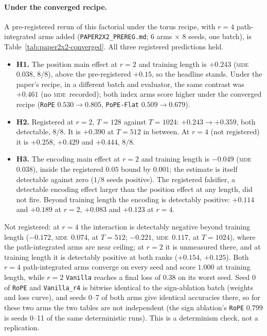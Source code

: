 \documentclass[10pt]{article}
\newcommand{\mde}{\textsc{mde}}
\newcommand{\arm}[1]{\texttt{#1}}
\begin{document}
\PaperTwoByTwoTable

\paragraph{Under the converged recipe.} A pre-registered rerun of this factorial under the torus
recipe, with $r=4$ path-integrated arms added (\texttt{PAPER2X2\_PREREG.md}; 6 arms $\times$ 8 seeds,
one batch), is Table~\ref{tab:paper2x2-converged}. All three registered predictions held.
\begin{itemize}
\item \textbf{H1.} The position main effect at $r=2$ and training length is $+0.243$ (\mde\ $0.038$,
$8/8$), above the pre-registered $+0.15$, so the headline stands. Under the paper's recipe, in a different
batch and evaluator, the same contrast was $+0.461$ (no \mde\ recorded); both index arms score higher under
the converged recipe (\arm{RoPE} $0.530\to0.805$, \arm{PoPE-Flat} $0.509\to0.679$).
\item \textbf{H2.} Registered at $r=2$, $T=128$ against $T=1024$: $+0.243\to+0.359$, both detectable, $8/8$.
It is $+0.390$ at $T=512$ in between. At $r=4$ (not registered) it is $+0.258$, $+0.429$ and $+0.444$, $8/8$.
\item \textbf{H3.} The encoding main effect at $r=2$ and training length is $-0.049$ (\mde\ $0.038$),
inside the registered $0.05$ bound by $0.001$; the estimate is itself detectable against zero ($1/8$ seeds
positive). The registered falsifier, a detectable encoding effect larger than the position effect at any
length, did not fire. Beyond training length the encoding is detectably positive: $+0.114$ and $+0.189$ at
$r=2$, $+0.083$ and $+0.123$ at $r=4$.
\end{itemize}
Not registered: at $r=4$ the interaction is detectably negative beyond training length ($-0.172$, \mde\
$0.074$, at $T=512$; $-0.221$, \mde\ $0.117$, at $T=1024$), where the path-integrated arms are near ceiling; at
$r=2$ it is unmeasured there, and at training length it is detectably positive at both ranks ($+0.154$,
$+0.125$). Both $r=4$ path-integrated arms converge on every seed and score $1.000$ at training length,
while $r=2$ \arm{Vanilla} reaches a final loss of $0.38$ on its worst seed. Seed 0 of \arm{RoPE} and
\arm{Vanilla\_r4} is bitwise identical to the sign-ablation batch (weights and loss curve), and seeds 0--7
of both arms give identical accuracies there, so for these two arms the two tables are not independent (the
sign ablation's \arm{RoPE} $0.799$ is seeds 0--11 of the same deterministic runs). This is a determinism
check, not a replication.
\end{document}
